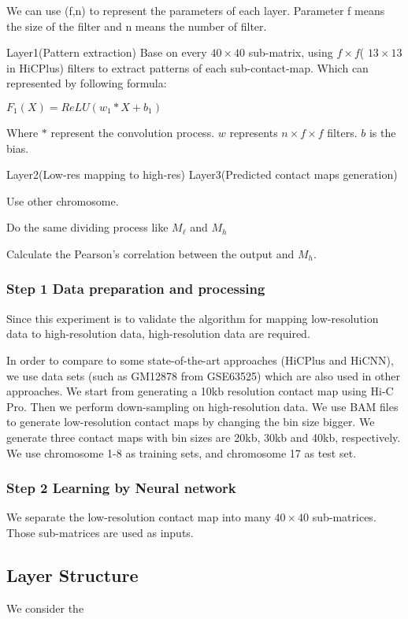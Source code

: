 \documentclass{article}
\begin{document}
\noindent We can use (f,n) to represent the parameters of each layer. Parameter f means the size of the filter and n means the number of filter. 

\noindent Layer1(Pattern extraction)
Base on every $40 \times 40$ sub-matrix, using $f \times f$( $13 \times 13$ in HiCPlus) filters
to extract patterns of each sub-contact-map. Which can represented by following formula:
\begin{center}
$F_1(X) = ReLU(w_1 * X + b_1)$
\end{center}
Where $*$ represent the convolution process. $w$ represents $n \times f \times f$ filters. 
$b$ is the bias.
 
Layer2(Low-res mapping to high-res)
Layer3(Predicted contact maps generation)


Use other chromosome. 

Do the same dividing process like $M_\ell$ and $M_h$

Calculate the Pearson's correlation between the output and $M_h$.







\subsubsection*{Step 1 Data preparation and processing}
Since this experiment is to validate the algorithm for mapping low-resolution data to high-resolution data, 
high-resolution data are required. 

In order to compare to some state-of-the-art approaches (HiCPlus and HiCNN), 
we use data sets (such as GM12878 from GSE63525) which are also used in other approaches. 
We start from generating a 10kb resolution contact map 
using Hi-C Pro. 
Then we perform down-sampling on high-resolution data. 
We use BAM files to generate low-resolution contact maps by changing the bin size bigger. 
We generate three contact maps with bin sizes are 20kb, 30kb and 40kb, respectively. 
We use chromosome 1-8 as training sets, and chromosome 17 as test set.

\subsubsection*{Step 2 Learning by Neural network}
We separate the low-resolution contact map into many $40 \times 40$ sub-matrices. 
Those sub-matrices are used as inputs.

\subsection{Layer Structure}
We consider the 





 
\end{document}
